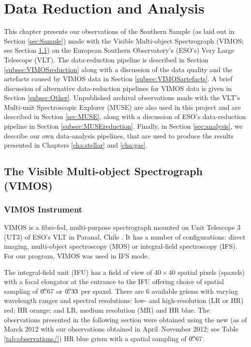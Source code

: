 \chapter{Data Reduction and Analysis}
	\label{cha:Data}
This chapter presents our observations of the Southern Sample (as laid out in Section \ref{sec:Sample}) made with the Visible Multi-object Spectrograph (VIMOS; see Section \ref{sec:VIMOS}) on the European Southern Observatory's (ESO's) Very Large Telescope (VLT). The data-reduction pipeline is described in Section \ref{subsec:VIMOSreduction} along with a discussion of the data quality and the artefacts caused by VIMOS data in Section \ref{subsec:VIMOSartefacts}. A brief discussion of alternative data-reduction pipelines for VIMOS data is given in Section \ref{subsec:Other}. Unpublished archival observations made with the VLT's Multi-unit Spectroscopic Explorer (MUSE) are also used in this project and are described in Section \ref{sec:MUSE}, along with a discussion of ESO's data-reduction pipeline in Section \ref{subsec:MUSEreduction}. Finally, in Section \ref{sec:analysis}, we describe our own data-analysis pipelines, that are used to produce the results presented in Chapters \ref{cha:stellar} and \ref{cha:gas}.  

\section{The Visible Multi-object Spectrograph (VIMOS)}
	\label{sec:VIMOS}
	\subsection{VIMOS Instrument}
		VIMOS is a fibre-fed, multi-purpose spectrograph mounted on Unit Telescope 3 (UT3) of ESO's VLT in Paranal, Chile \citep{LeFevre2003}. It has a number of configurations: direct imaging, multi-object spectroscopy (MOS) or integral-field spectroscopy (IFS). For our program, VIMOS was used in IFS mode. 

		The integral-field unit (IFU) has a field of view of $40 \times 40$ spatial pixels (spaxels) with a focal elongator at the entrance to the IFU offering choice of spatial sampling of $0 \hbox{$.\!\!^{\prime\prime}$}67$ or $0 \hbox{$.\!\!^{\prime\prime}$}33$ per spaxel. There are 6 available grisms with varying wavelength ranges and spectral resolutions: low- and high-resolution (LR or HR) red; HR orange; and LR, medium resolution (MR) and HR blue. The observations presented in the following section were obtained using the new (as of March 2012 with our observations obtained in April--November 2012; see Table \ref{tab:observations/}) HR blue grism with a spatial sampling of $0 \hbox{$.\!\!^{\prime\prime}$}67$. 


